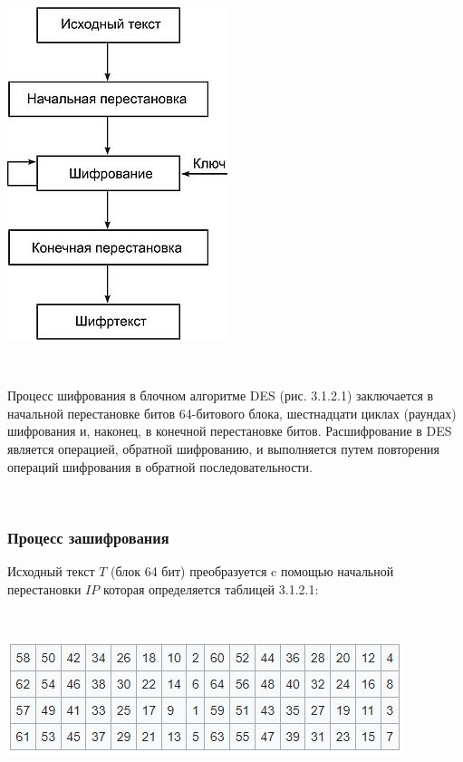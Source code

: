 \documentclass[a4paper]{report}
\begin{document}
\includegraphics[scale=1.4]{DES}
{\\}

~

Процесс шифрования в блочном алгоритме DES (рис. 3.1.2.1) заключается в начальной перестановке битов 64-битового блока, шестнадцати циклах (раундах) шифрования и, наконец, в конечной переста­новке битов. Расшифрование в DES является операцией, обратной шифрованию, и выполняется путем повторения операций шифрования в обратной последовательности.

~

\subsubsection{Процесс зашифрования}
Исходный текст $T$ (блок 64 бит) преобразуется c помощью начальной перестановки $IP$ которая определяется таблицей 3.1.2.1:

~

\includegraphics[scale=1.1]{табл}
{\\}
\end{document}
